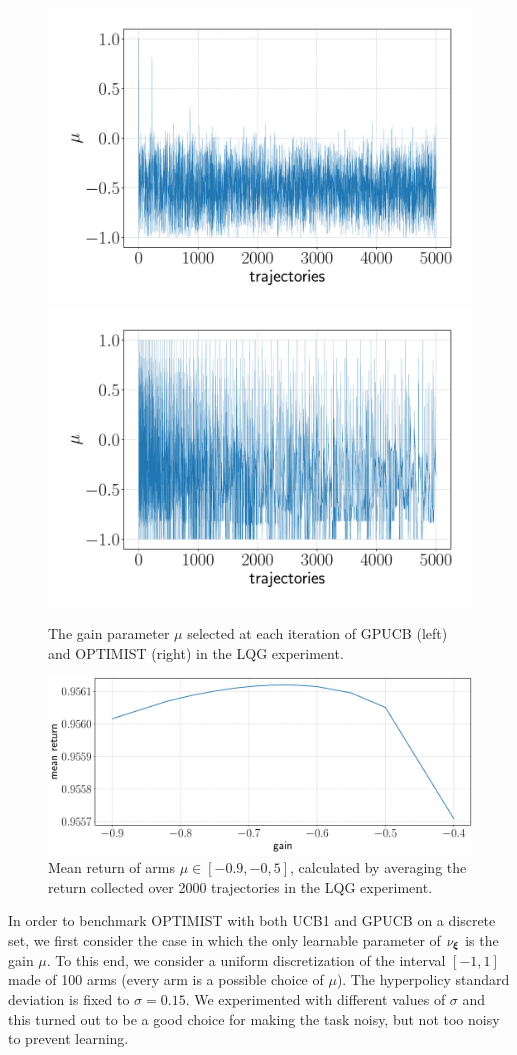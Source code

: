 \begin{figure}[t!] 
\includegraphics[width=.5\textwidth]{Images/LQG_GPUCB_mu.pdf}\hfill
\includegraphics[width=.5\textwidth]{Images/LQG_OPTIMIST_mu.pdf}\hfill
\caption{The gain parameter $\mu$ selected at each iteration of \gls{GPUCB} (left) and \gls{OPTIMIST} (right) in the \gls{LQG} experiment.}
\label{fig:LQGmu}
\end{figure}


\begin{figure}[t!]
\centering
\includegraphics[width=.75\textwidth,keepaspectratio]{Images/LQG_optimal_gain.pdf}
\caption{Mean return of arms $\mu\in[-0.9,-0,5]$, calculated by averaging the return collected over 2000 trajectories in the \gls{LQG} experiment.}
\label{fig:LQGoptimalgain}
\end{figure}

In order to benchmark \gls{OPTIMIST} with both \gls{UCB}1 and \gls{GPUCB} on a discrete set, we first consider the case in which the only learnable parameter of $\nu_{\boldsymbol{\xi}}$ is the gain $\mu$. To this end, we consider a uniform discretization of the interval $[-1,1]$ made of 100 arms (every arm is a possible choice of $\mu$). The hyperpolicy standard deviation is fixed to $\sigma=0.15$. We experimented with different values of $\sigma$ and this turned out to be a good choice for making the task noisy, but not too noisy to prevent learning.

